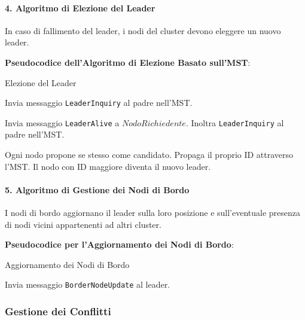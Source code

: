 \documentclass[12pt, a4paper]{report}
\begin{document}
\paragraph{4. Algoritmo di Elezione del Leader}

In caso di fallimento del leader, i nodi del cluster devono eleggere un nuovo leader.

\textbf{Pseudocodice dell'Algoritmo di Elezione Basato sull'MST}:

\begin{algorithm}[H]
\caption{Elezione del Leader}
\begin{algorithmic}[1]
        \State Invia messaggio \texttt{LeaderInquiry} al padre nell'MST.
    \EndIf
\EndProcedure

        \State Invia messaggio \texttt{LeaderAlive} a $NodoRichiedente$.
    \Else
        \State Inoltra \texttt{LeaderInquiry} al padre nell'MST.
    \EndIf
\EndProcedure

    \State Ogni nodo propone se stesso come candidato.
    \State Propaga il proprio ID attraverso l'MST.
    \State Il nodo con ID maggiore diventa il nuovo leader.
\EndProcedure
\end{algorithmic}
\end{algorithm}

\paragraph{5. Algoritmo di Gestione dei Nodi di Bordo}

I nodi di bordo aggiornano il leader sulla loro posizione e sull'eventuale presenza di nodi vicini appartenenti ad altri cluster.

\textbf{Pseudocodice per l'Aggiornamento dei Nodi di Bordo}:

\begin{algorithm}[H]
\caption{Aggiornamento dei Nodi di Bordo}
\begin{algorithmic}[1]
            \State Invia messaggio \texttt{BorderNodeUpdate} al leader.
        \EndIf
    \EndFor
\EndProcedure
\end{algorithmic}
\end{algorithm}

\subsubsection{Gestione dei Conflitti}
\end{document}
